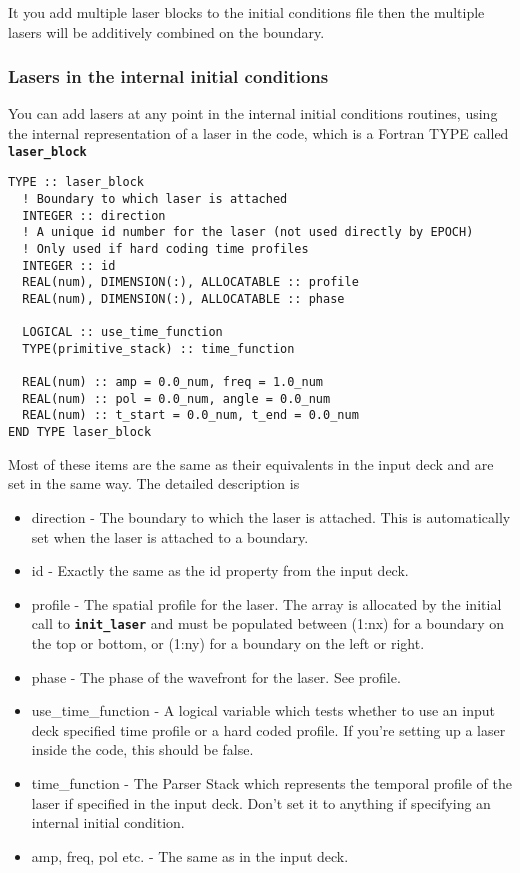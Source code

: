\documentclass[12pt,a4paper]{article}
\newcommand{\simpleboxverbatim}{\begin{Verbatim}[obeytabs=true,frame=single,
  framerule=0.5mm,rulecolor=\color{warwickmid},formatcom=\color{black}]}
\newcommand{\inlinecode}[1]{{\color{warwickred} \bf\texttt{#1}}}
\begin{document}
It you add multiple laser blocks to the initial conditions file then the
multiple lasers will be additively combined on the boundary.

\subsubsection{Lasers in the internal initial conditions}
You can add lasers at any point in the internal initial conditions routines,
using the internal representation of a laser in the code, which is a Fortran
TYPE called \inlinecode{laser\_block}
\simpleboxverbatim
TYPE :: laser_block
  ! Boundary to which laser is attached
  INTEGER :: direction
  ! A unique id number for the laser (not used directly by EPOCH)
  ! Only used if hard coding time profiles
  INTEGER :: id
  REAL(num), DIMENSION(:), ALLOCATABLE :: profile
  REAL(num), DIMENSION(:), ALLOCATABLE :: phase

  LOGICAL :: use_time_function
  TYPE(primitive_stack) :: time_function

  REAL(num) :: amp = 0.0_num, freq = 1.0_num
  REAL(num) :: pol = 0.0_num, angle = 0.0_num
  REAL(num) :: t_start = 0.0_num, t_end = 0.0_num
END TYPE laser_block
\end{Verbatim}
Most of these items are the same as their equivalents in the input deck and
are set in the same way. The detailed description is
\begin{itemize}
\item direction - The boundary to which the laser is attached. This is
  automatically set when the laser is attached to a boundary.
\item id - Exactly the same as the id property from the input deck.
\item profile - The spatial profile for the laser. The array is allocated by
  the initial call to \inlinecode{init\_laser} and must be populated between
  (1:nx) for a boundary on the top or bottom, or (1:ny) for a boundary on the
  left or right.
\item phase - The phase of the wavefront for the laser. See profile.
\item use\_time\_function - A logical variable which tests whether to use an
  input deck specified time profile or a hard coded profile. If you're setting
  up a laser inside the code, this should be false.
\item time\_function - The Parser Stack which represents the temporal profile of
  the laser if specified in the input deck. Don't set it to anything if
  specifying an internal initial condition.
\item amp, freq, pol etc. - The same as in the input deck.
\end{itemize}
\end{document}
